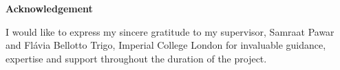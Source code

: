 \begin{center}
    \fontsize{20pt}{25pt}\selectfont
    \textbf{Acknowledgement}
\end{center}

\vspace{1.5cm}

I would like to express my sincere gratitude to my supervisor, Samraat Pawar and Flávia Bellotto Trigo, Imperial College London for invaluable guidance, expertise and support throughout the duration of the project.


\vspace{2cm}

